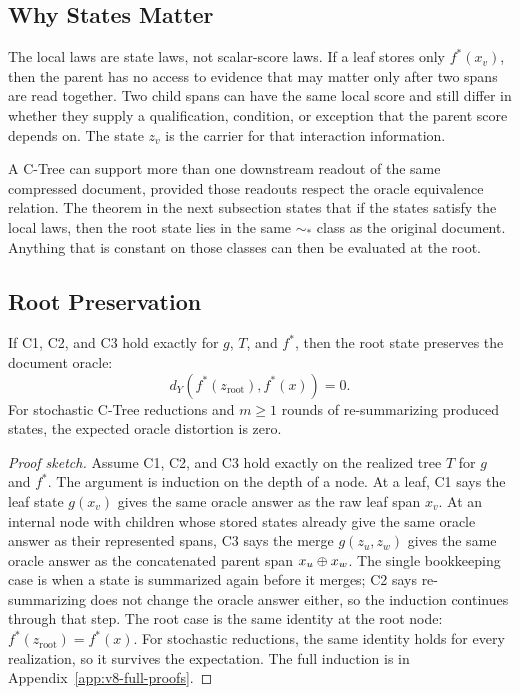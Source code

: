 \subsection{Why States Matter}

The local laws are state laws, not scalar-score laws. If a leaf
stores only \(f^\ast(x_v)\), then the parent has no access to
evidence that may matter only after two spans are read together.
Two child spans can have the same local score and still differ in
whether they supply a qualification, condition, or exception that
the parent score depends on. The state \(z_v\) is the carrier for
that interaction information.

A C-Tree can support more than one downstream readout of the same
compressed document, provided those readouts respect the oracle
equivalence relation. The theorem in the next subsection states
that if the states satisfy the local laws, then the root state
lies in the same \(\sim_\ast\) class as the original document.
Anything that is constant on those classes can then be evaluated
at the root.

\subsection{Root Preservation}

\begin{theorem}\label{thm:v8-root-preservation}
If C1, C2, and C3 hold exactly for \(g\), \(T\), and \(f^\ast\), then the root
state preserves the document oracle:
\[
  d_Y\!\left(f^\ast(z_{\mathrm{root}}),f^\ast(x)\right)=0 .
\]
For stochastic C-Tree reductions and \(m\ge 1\) rounds of
re-summarizing produced states, the expected oracle distortion is
zero.
\end{theorem}

\begin{proof}[Proof sketch]
Assume C1, C2, and C3 hold exactly on the realized tree \(T\) for
\(g\) and \(f^\ast\). The argument is induction on the depth of a
node. At a leaf, C1 says the leaf state \(g(x_v)\) gives the same
oracle answer as the raw leaf span \(x_v\). At an internal node with
children whose stored states already give the same oracle answer as
their represented spans, C3 says the merge \(g(z_u,z_w)\) gives the
same oracle answer as the concatenated parent span \(x_u\oplus x_w\).
The single bookkeeping case is when a state is summarized again
before it merges; C2 says re-summarizing does not change the oracle
answer either, so the induction continues through that step. The
root case is the same identity at the root node:
\(f^\ast(z_{\mathrm{root}})=f^\ast(x)\). For stochastic reductions,
the same identity holds for every realization, so it survives the
expectation. The full induction is in
Appendix~\ref{app:v8-full-proofs}.
\end{proof}

